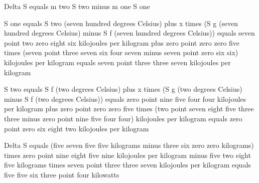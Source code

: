 Delta S equals m two S two minus m one S one

S one equals S two (seven hundred degrees Celsius) plus x times (S g (seven hundred degrees Celsius) minus S f (seven hundred degrees Celsius)) equals seven point two zero eight six kilojoules per kilogram plus zero point zero zero five times (seven point three seven six four seven minus seven point zero six six) kilojoules per kilogram equals seven point three three seven kilojoules per kilogram

S two equals S f (two degrees Celsius) plus x times (S g (two degrees Celsius) minus S f (two degrees Celsius)) equals zero point nine five four four kilojoules per kilogram plus zero point zero zero five times (two point seven eight five three three minus zero point nine five four four) kilojoules per kilogram equals zero point zero six eight two kilojoules per kilogram

Delta S equals (five seven five five kilograms minus three six zero zero kilograms) times zero point nine eight five nine kilojoules per kilogram minus five two eight five kilograms times seven point three three seven kilojoules per kilogram equals five five six three point four kilowatts